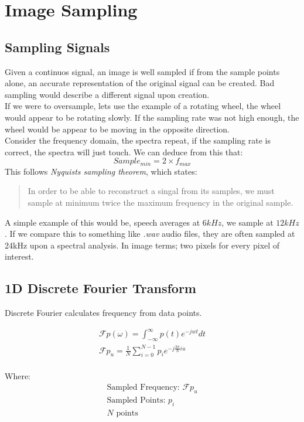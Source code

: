 \section{Image Sampling}

\subsection{Sampling Signals}
Given a continuos signal, an image is well sampled if from the sample points alone, an accurate representation of the original signal can be created. Bad sampling would describe a different signal upon creation.
\\
If we were to oversample, lets use the example of a rotating wheel, the wheel would appear to be rotating slowly. If the sampling rate was not high enough, the wheel would be appear to be moving in the opposite direction.
\\
Consider the frequency domain, the spectra repeat, if the sampling rate is correct, the spectra will just touch. We can deduce from this that:
\begin{equation}
    Sample_{min} = 2 \times f_{max}
\end{equation}
This follows \textit{Nyquists sampling theorem}, which states:
\begin{quote}
    In order to be able to reconstruct a singal from its samples, we must sample at minimum twice the maximum frequency in the original sample.
\end{quote}
A simple example of this would be, speech averages at $6kHz$, we sample at $12kHz$. If we compare this to something like \textit{.wav} audio files, they are often sampled at 24kHz upon a spectral analysis. In image terms; two pixels for every pixel of interest.

\subsection{1D Discrete Fourier Transform}
Discrete Fourier calculates frequency from data points.

\begin{align}
    \mathcal{F}p(\omega) = \int_{-\infty}^{\infty}p(t)e^{-jwt}dt \\
    \mathcal{F}p_{u} =\frac{1}{N}\sum_{i=0}^{N-1}p_{i}e^{-j\frac{2\pi}{N}iu} \\
\end{align}

Where:
\begin{align}
    \text{Sampled Frequency: } \mathcal{F}p_{u} \\
    \text{Sampled Points: } p_{i}\\
    N \text{ points}
\end{align}

